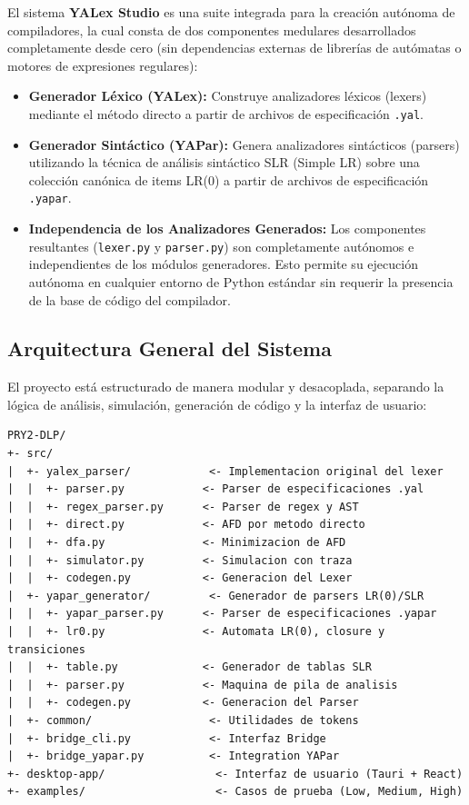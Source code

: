 \documentclass[12pt,letterpaper]{article}
\begin{document}
El sistema \textbf{YALex Studio} es una suite integrada para la creación autónoma de compiladores, la cual consta de dos componentes medulares desarrollados completamente desde cero (sin dependencias externas de librerías de autómatas o motores de expresiones regulares):
\begin{itemize}
    \item \textbf{Generador Léxico (YALex):} Construye analizadores léxicos (lexers) mediante el método directo a partir de archivos de especificación \texttt{.yal}.
    \item \textbf{Generador Sintáctico (YAPar):} Genera analizadores sintácticos (parsers) utilizando la técnica de análisis sintáctico SLR (Simple LR) sobre una colección canónica de items LR(0) a partir de archivos de especificación \texttt{.yapar}.
    \item \textbf{Independencia de los Analizadores Generados:} Los componentes resultantes (\texttt{lexer.py} y \texttt{parser.py}) son completamente autónomos e independientes de los módulos generadores. Esto permite su ejecución autónoma en cualquier entorno de Python estándar sin requerir la presencia de la base de código del compilador.
\end{itemize}

\subsection{Arquitectura General del Sistema}
El proyecto está estructurado de manera modular y desacoplada, separando la lógica de análisis, simulación, generación de código y la interfaz de usuario:

\begin{verbatim}
PRY2-DLP/
+- src/
|  +- yalex_parser/            <- Implementacion original del lexer
|  |  +- parser.py            <- Parser de especificaciones .yal
|  |  +- regex_parser.py      <- Parser de regex y AST
|  |  +- direct.py            <- AFD por metodo directo
|  |  +- dfa.py               <- Minimizacion de AFD
|  |  +- simulator.py         <- Simulacion con traza
|  |  +- codegen.py           <- Generacion del Lexer
|  +- yapar_generator/         <- Generador de parsers LR(0)/SLR
|  |  +- yapar_parser.py      <- Parser de especificaciones .yapar
|  |  +- lr0.py               <- Automata LR(0), closure y transiciones
|  |  +- table.py             <- Generador de tablas SLR
|  |  +- parser.py            <- Maquina de pila de analisis
|  |  +- codegen.py           <- Generacion del Parser
|  +- common/                  <- Utilidades de tokens
|  +- bridge_cli.py            <- Interfaz Bridge
|  +- bridge_yapar.py          <- Integration YAPar
+- desktop-app/                 <- Interfaz de usuario (Tauri + React)
+- examples/                    <- Casos de prueba (Low, Medium, High)
\end{verbatim}
\end{document}
